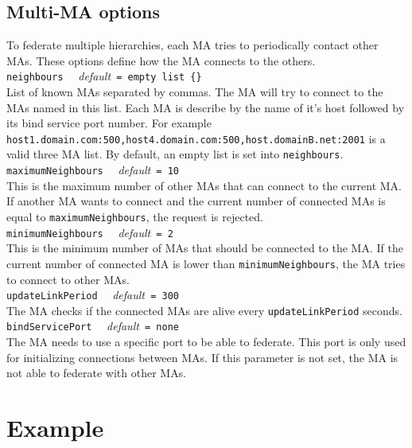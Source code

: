 \subsection{Multi-MA options}

To federate multiple hierarchies, each MA tries to periodically contact other
MAs. These options define how the MA connects to the others.\\

\noindent
\texttt{neighbours} \ \ \emph{default}\texttt{ = empty list \{\}} \\
List of known MAs separated by commas. The MA
will try to connect to the MAs named in this list. Each MA is describe
by the name of it's host followed by its bind service port number. For
example
\texttt{host1.domain.com:500,host4.domain.com:500,host.domainB.net:2001}
is a valid three MA list. By default, an empty list is set into
\texttt{neighbours}.\\

\noindent
\texttt{maximumNeighbours} \ \ \emph{default}\texttt{ = 10}\\ This is
the maximum number of other MAs that can connect to the current MA.
If another MA wants to connect and the current number of connected
MAs is equal to \texttt{maximumNeighbours}, the request is
rejected.\\

\noindent
\texttt{minimumNeighbours} \ \ \emph{default}\texttt{ = 2}\\ This is
the minimum number of MAs that should be connected to the MA. If the
current number of connected MA is lower than
\texttt{minimumNeighbours}, the MA tries to connect to other MAs.\\

\noindent
\texttt{updateLinkPeriod} \ \ \emph{default}\texttt{ = 300}\\ The MA
checks if the connected MAs are alive every \texttt{updateLinkPeriod}
seconds.\\

\noindent
\texttt{bindServicePort} \ \ \emph{default}\texttt{ = none}\\ 
The MA needs to use a specific port to be able to federate. This
port is only used for initializing connections between MAs. If this
parameter is not set, the MA is not able to federate with other
MAs.\\


\section{Example}
\label{sec:deploy_ex}


